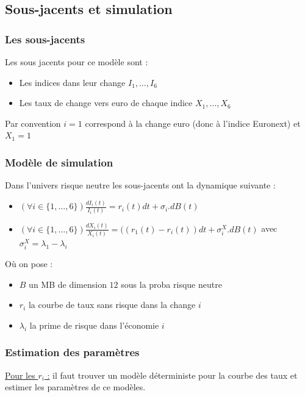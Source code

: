 \documentclass[a4paper,12pt]{article}
\begin{document}
\subsection{Sous-jacents et simulation}
\subsubsection{Les sous-jacents}
Les sous jacents pour ce modèle sont : 
\begin{itemize}[label=$\star$]
\item Les indices dans leur change $I_1,\ldots,I_6$
\item Les taux de change vers euro de chaque indice $X_1,\ldots,X_6$
\end{itemize}
Par convention $i=1$ correspond à la change euro (donc à l'indice Euronext) et $X_1=1$
\subsubsection{Modèle de simulation}
Dans l'univers risque neutre les sous-jacents ont la dynamique suivante : 
\begin{itemize}[label=$\star$]
\item $\left(\forall i\in\{1,\ldots,6\}\right) \frac{dI_i(t)}{I_i(t)}=r_i(t)dt + \sigma_i.dB(t)$
\item $\left(\forall i\in\{1,\ldots,6\}\right) \frac{dX_i(t)}{X_i(t)}=((r_1(t)-r_i(t))dt+\sigma^X_i.dB(t)$ avec $\sigma^X_i= \lambda_1-\lambda_i$
\end{itemize}
Où on pose : 
\begin{itemize}[label=$\bullet$]
\item $B$ un MB de dimension $12$ sous la proba risque neutre
\item $r_i$ la courbe de taux sans risque dans la change $i$
\item $\lambda_i$ la prime de risque dans l'économie $i$
\end{itemize}
\subsubsection{Estimation des paramètres}
\underline{Pour les $r_i$ :} il faut trouver un modèle déterministe pour la courbe des taux et estimer les paramètres de ce modèles. \\
\end{document}
